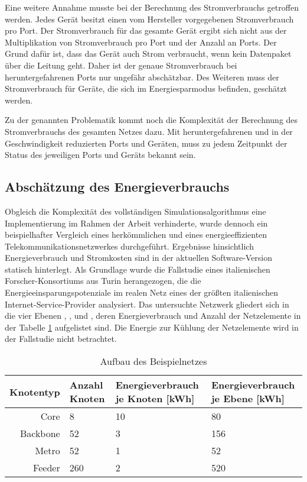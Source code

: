 Eine weitere Annahme musste bei der Berechnung des Stromverbrauchs getroffen werden. Jedes Gerät besitzt einen vom Hersteller vorgegebenen Stromverbrauch pro Port. Der Stromverbrauch für das gesamte Gerät ergibt sich nicht aus der Multiplikation von Stromverbrauch pro Port und der Anzahl an Ports. Der Grund dafür ist, dass das Gerät auch Strom verbraucht, wenn kein Datenpaket über die Leitung geht. Daher ist der genaue Stromverbrauch bei heruntergefahrenen Ports nur ungefähr abschätzbar. Des Weiteren  muss der Stromverbrauch für Geräte, die sich im Energiesparmodus befinden, geschätzt werden. 

Zu der genannten Problematik kommt noch die Komplexität der Berechnung des Stromverbrauchs des gesamten Netzes dazu. Mit heruntergefahrenen und in der Geschwindigkeit reduzierten Ports und Geräten, muss zu jedem Zeitpunkt der Status des jeweiligen Ports und Geräts bekannt sein.  


\subsection{Abschätzung des Energieverbrauchs} \label{subsec:VorgSch}

Obgleich die Komplexität des vollständigen Simulationsalgorithmus eine Implementierung im Rahmen der Arbeit verhinderte, wurde dennoch ein beispielhafter Vergleich eines herkömmlichen und eines energieeffizienten Telekommunikationsnetzwerkes durchgeführt. Ergebnisse hinsichtlich Energieverbrauch und Stromkosten sind in der aktuellen Software-Version statisch hinterlegt. Als Grundlage wurde die Fallstudie eines italienischen Forscher-Konsortiums aus Turin herangezogen, die die Energieeinsparungspotenziale im realen Netz eines der größten italienischen Internet-Service-Provider analysiert\cite{Chiaraviglio2009}. Das untersuchte Netzwerk gliedert sich in die vier Ebenen , ,  und , deren Energieverbrauch und Anzahl der Netzelemente in der Tabelle \ref{tab:beispielnetz} aufgelistet sind\cite[2]{Chiaraviglio2009}. Die Energie zur Kühlung der Netzelemente wird in der Fallstudie nicht betrachtet.




\begin{table}[htb]
\centering
\caption{Aufbau des Beispielnetzes}
\label{tab:beispielnetz}
\begin{tabularx}{\textwidth}{ | r | l | X | X | }
	\hline
	\textbf{Knotentyp} & \textbf{Anzahl Knoten} & \textbf{Energieverbrauch \newline je Knoten [kWh]} & \textbf{Energieverbrauch \newline je Ebene [kWh]}\\ \hline\hline
Core & 8 & 10 & 80\\ \hline
Backbone & 52 & 3 & 156\\ \hline
Metro & 52 & 1 & 52\\ \hline
Feeder & 260 & 2 & 520\\ \hline
\end{tabularx}
\end{table}

